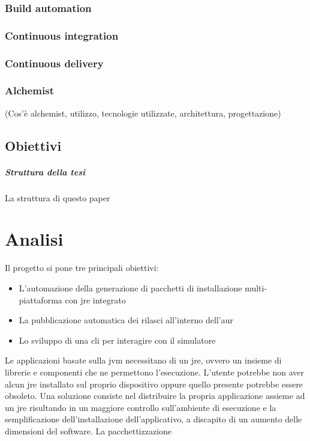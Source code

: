 \documentclass[12pt,a4paper,openright,twoside]{book}
\begin{document}
\subsection{Build automation}
\subsection{Continuous integration}
\subsection{Continuous delivery}
\subsection{Alchemist}

(Cos'è alchemist, utilizzo, tecnologie utilizzate, architettura, progettazione)

\section{Obiettivi}

\paragraph{Struttura della tesi}

La struttura di questo paper

\chapter{Analisi}

Il progetto si pone tre principali obiettivi:
\begin{itemize}
	\item L'automazione della generazione di pacchetti di installazione multi-piattaforma con \ac{jre} integrato
	\item La pubblicazione automatica dei rilasci all'interno dell'\ac{aur}
	\item Lo sviluppo di una \ac{cli} per interagire con il simulatore
\end{itemize}

Le applicazioni basate sulla \ac{jvm} necessitano di un \ac{jre}, ovvero un insieme di librerie e componenti che ne permettono l'esecuzione. L'utente potrebbe non aver alcun \ac{jre} installato sul proprio dispositivo oppure quello presente potrebbe essere obsoleto. Una soluzione consiste nel distribuire la propria applicazione assieme ad un \ac{jre} risultando in un maggiore controllo sull'ambiente di esecuzione e la semplificazione dell'installazione dell'applicativo, a discapito di un aumento delle dimensioni del software. La pacchettizzazione 
\end{document}
